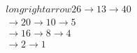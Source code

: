 \documentclass[preview]{standalone}
\begin{document}
\begin{align*}
longrightarrow 26 \longrightarrow 13 \longrightarrow 40  \\\longrightarrow 20 \longrightarrow 10 \longrightarrow 5 \\\longrightarrow 16 \longrightarrow 8 \longrightarrow 4 \\\longrightarrow 2 \longrightarrow 1
\end{align*}
\end{document}
